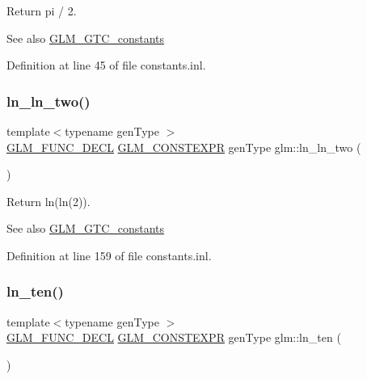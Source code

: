 Return pi / 2. \begin{DoxySeeAlso}{See also}
\mbox{\hyperlink{group__gtc__constants}{G\+L\+M\+\_\+\+G\+T\+C\+\_\+constants}} 
\end{DoxySeeAlso}


Definition at line 45 of file constants.\+inl.

\mbox{\label{group__gtc__constants_gaca94292c839ed31a405ab7a81ae7e850}} 
\subsubsection{\texorpdfstring{ln\_ln\_two()}{ln\_ln\_two()}}
{\footnotesize\ttfamily template$<$typename gen\+Type $>$ \\
\mbox{\hyperlink{setup_8hpp_ab2d052de21a70539923e9bcbf6e83a51}{G\+L\+M\+\_\+\+F\+U\+N\+C\+\_\+\+D\+E\+CL}} \mbox{\hyperlink{setup_8hpp_a08b807947b47031d3a511f03f89645ad}{G\+L\+M\+\_\+\+C\+O\+N\+S\+T\+E\+X\+PR}} gen\+Type glm\+::ln\+\_\+ln\+\_\+two (\begin{DoxyParamCaption}{ }\end{DoxyParamCaption})}

Return ln(ln(2)). \begin{DoxySeeAlso}{See also}
\mbox{\hyperlink{group__gtc__constants}{G\+L\+M\+\_\+\+G\+T\+C\+\_\+constants}} 
\end{DoxySeeAlso}


Definition at line 159 of file constants.\+inl.

\mbox{\label{group__gtc__constants_gaf97ebc6c059ffd788e6c4946f71ef66c}} 
\subsubsection{\texorpdfstring{ln\_ten()}{ln\_ten()}}
{\footnotesize\ttfamily template$<$typename gen\+Type $>$ \\
\mbox{\hyperlink{setup_8hpp_ab2d052de21a70539923e9bcbf6e83a51}{G\+L\+M\+\_\+\+F\+U\+N\+C\+\_\+\+D\+E\+CL}} \mbox{\hyperlink{setup_8hpp_a08b807947b47031d3a511f03f89645ad}{G\+L\+M\+\_\+\+C\+O\+N\+S\+T\+E\+X\+PR}} gen\+Type glm\+::ln\+\_\+ten (\begin{DoxyParamCaption}{ }\end{DoxyParamCaption})}

